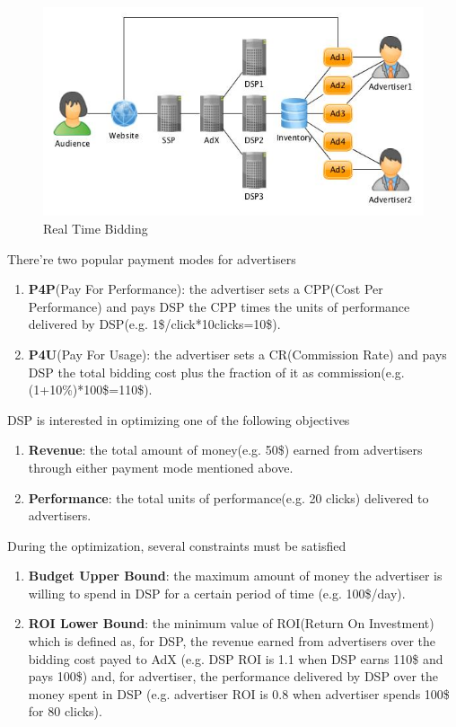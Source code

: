 \documentclass[sigconf]{acmart}
\begin{document}
\begin{figure}[!h]
\centering
\includegraphics[width=1.0\linewidth]{./DSP.jpg}
\caption{Real Time Bidding}
\end{figure}

There're two popular payment modes for advertisers
\begin{enumerate}
\item \textbf{P4P}(Pay For Performance): the advertiser sets a CPP(Cost Per Performance)
    and pays DSP the CPP times the units of performance delivered by DSP(e.g. 1\$/click*10clicks=10\$).
\item \textbf{P4U}(Pay For Usage): the advertiser sets a CR(Commission Rate)
    and pays DSP the total bidding cost plus the fraction of it as commission(e.g. (1+10\%)*100\$=110\$).
\end{enumerate}

DSP is interested in optimizing one of the following objectives
\begin{enumerate}
\item \textbf{Revenue}: the total amount of money(e.g. 50\$) earned from advertisers through either payment mode mentioned above.
\item \textbf{Performance}: the total units of performance(e.g. 20 clicks) delivered to advertisers.
\end{enumerate}

During the optimization, several constraints must be satisfied
\begin{enumerate}
\item \textbf{Budget Upper Bound}: the maximum amount of money the advertiser is willing to spend in DSP for a certain period of time
  (e.g. 100\$/day).
\item \textbf{ROI Lower Bound}: the minimum value of ROI(Return On Investment) which is defined as,
  for DSP, the revenue earned from advertisers over the bidding cost payed to AdX
  (e.g. DSP ROI is 1.1 when DSP earns 110\$ and pays 100\$) and,
  for advertiser, the performance delivered by DSP over the money spent in DSP
  (e.g. advertiser ROI is 0.8 when advertiser spends 100\$ for 80 clicks).
\end{enumerate}
\end{document}
